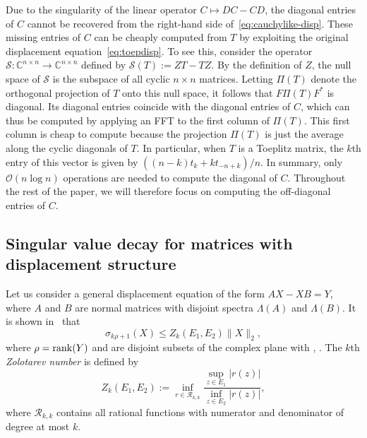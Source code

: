 \documentclass[final,reqno,onefignum,onetabnum]{siamart190516}
\newcommand{ \rank}{{\rm rank}}
\begin{document}
Due to the singularity of the linear operator $C \mapsto DC - CD$, the diagonal entries of $C$ cannot be recovered from the right-hand side of~\eqref{eq:cauchylike-disp}. These missing entries of $C$ can be cheaply computed from $T$ by exploiting the original displacement equation~\eqref{eq:toepdisp}. To see this, consider the operator $\mathcal{S}:  \mathbb{C}^{n \times n} \to \mathbb{C}^{n \times n}$ defined by $\mathcal{S}(T) := ZT-TZ$. By the definition of $Z$, the null space of $\mathcal{S}$ is the subspace of all cyclic $n \times n$ matrices. Letting 
$\Pi(T)$ denote the orthogonal projection of $T$ onto this null space, it follows that $F \Pi(T) F^*$ is diagonal. Its diagonal entries coincide with the diagonal entries of $C$, which can thus be computed by
applying an FFT to the first column of $\Pi(T)$. This first column is cheap to compute because the projection
$\Pi(T)$ is just the average along the cyclic diagonals of $T$. In particular, when $T$ is a Toeplitz matrix,
the $k$th entry of this vector is given by 
$ \left( (n-k)t_{k}  + k t_{-n+k}  \right)/n.$
In summary, only $\mathcal{O}(n \log n)$ operations are needed to compute the diagonal of $C$. Throughout the rest of the paper, we will therefore focus on computing the off-diagonal entries of $C$.


 \subsection{Singular value decay for matrices with displacement structure}
 \label{sec:zolotarev}
 Let us consider a general displacement equation of the form $AX - XB = Y$, where $A$ and $B$ are normal matrices with disjoint spectra $\Lambda(A)$ and $\Lambda(B)$. It is shown in~\cite{Beckermann2019} that 
\begin{equation} 
\label{eq:zolobound_svs}
\sigma_{k \rho + 1}(X) \leq Z_{k}(E_1, E_2) \|X\|_2,
\end{equation}
where $\rho = \rank(Y)$ and  are disjoint subsets of the complex plane with , .
The $k$th \textit{Zolotarev number}  is defined by 
\begin{equation} \label{eq:zolotarev}
 Z_k(E_1,E_2) := \inf_{r\in \mathcal{R}_{k,k}} \frac{\sup_{z \in E_1} |r(z)| }{\inf_{z \in E_2} |r(z)|},
\end{equation}
where $\mathcal{R}_{k,k}$ contains all rational functions with numerator and denominator of degree at most $k$.
\end{document}
